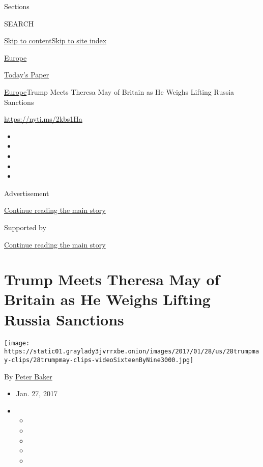 Sections

SEARCH

\protect\hyperlink{site-content}{Skip to
content}\protect\hyperlink{site-index}{Skip to site index}

\href{https://www.nytimes3xbfgragh.onion/section/world/europe}{Europe}

\href{https://myaccount.nytimes3xbfgragh.onion/auth/login?response_type=cookie\&client_id=vi}{}

\href{https://www.nytimes3xbfgragh.onion/section/todayspaper}{Today's
Paper}

\href{/section/world/europe}{Europe}\textbar{}Trump Meets Theresa May of
Britain as He Weighs Lifting Russia Sanctions

\url{https://nyti.ms/2kbs1Ha}

\begin{itemize}
\item
\item
\item
\item
\item
\end{itemize}

Advertisement

\protect\hyperlink{after-top}{Continue reading the main story}

Supported by

\protect\hyperlink{after-sponsor}{Continue reading the main story}

\hypertarget{trump-meets-theresa-may-of-britain-as-he-weighs-lifting-russia-sanctions}{%
\section{Trump Meets Theresa May of Britain as He Weighs Lifting Russia
Sanctions}\label{trump-meets-theresa-may-of-britain-as-he-weighs-lifting-russia-sanctions}}

\texttt{[image: https://static01.graylady3jvrrxbe.onion/images/2017/01/28/us/28trumpmay-clips/28trumpmay-clips-videoSixteenByNine3000.jpg]}

By \href{http://www.nytimes3xbfgragh.onion/by/peter-baker}{Peter Baker}

\begin{itemize}
\item
  Jan. 27, 2017
\item
  \begin{itemize}
  \item
  \item
  \item
  \item
  \item
  \end{itemize}
\end{itemize}

